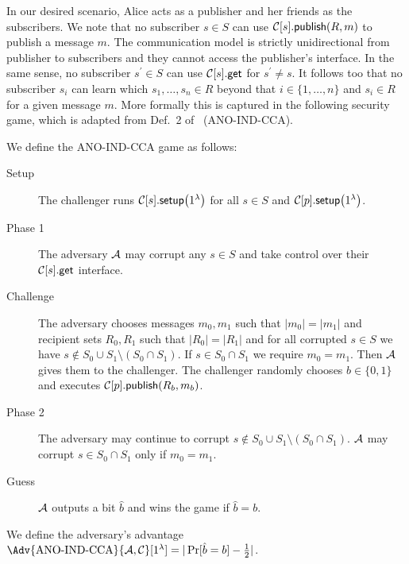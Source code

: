In our desired scenario, Alice acts as a publisher and her friends as the 
subscribers.
We note that no subscriber \(s\in S\) can use \(\cpub{s}[R][m]\) to publish 
a message \(m\).
The communication model is strictly unidirectional from publisher to 
subscribers and they cannot access the publisher's interface.
In the same sense, no subscriber \(s^\prime\in S\) can use \(\cget{s}\) for 
\(s^\prime\neq s\).
It follows too that no subscriber \(s_i\) can learn which \(s_1, \ldots, s_n\in 
  R\) beyond that \(i\in \{1, \ldots, n\}\) and \(s_i\in R\) for a given 
message \(m\).
More formally this is captured in the following security game, which is adapted 
from Def.\ 2 of~\cite{ANOBE} (ANO-IND-CCA).

\begin{definition}\label{ANO-IND-CCA}
  We define the ANO-IND-CCA game as follows:
  \begin{description}
    \item[Setup] The challenger runs \(\csetup{s}[1^\lambda]\) for all \(s\in 
        S\) and \(\csetup{p}[1^\lambda]\).
    \item[Phase 1] The adversary \(\A\) may corrupt any \(s\in S\) and take 
      control over their \(\cget{s}\) interface.
    \item[Challenge] The adversary chooses messages \(m_0, m_1\) such that 
      \(|m_0| = |m_1|\) and recipient sets \(R_0, R_1\) such that \(|R_0| 
        = |R_1|\) and for all corrupted \(s\in S\) we have \(s\notin S_0\cup 
        S_1\setminus (S_0\cap S_1)\).
      If \(s\in S_0\cap S_1\) we require \(m_0 = m_1\).
      Then \(\A\) gives them to the challenger.
      The challenger randomly chooses \(b\in \{0, 1\}\) and executes 
      \(\cpub{p}[R_b][m_b]\).
    \item[Phase 2] The adversary may continue to corrupt \(s\notin S_0\cup 
        S_1\setminus (S_0\cap S_1)\).
      \(\A\) may corrupt \(s\in S_0\cap S_1\) only if \(m_0 = m_1\).
    \item[Guess] \(\A\) outputs a bit \(\hat{b}\) and wins the game if 
      \(\hat{b} = b\).
  \end{description}
  We define the adversary's advantage \(\Adv{\text{ANO-IND-CCA}}{\A, 
      \Cop}[1^\lambda] = |\Pr[ \hat{b} = b ] - \frac{1}{2}|\).
\end{definition}


